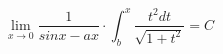 \documentclass[a4paper,UTF8]{article}
\begin{document}
$$ \lim_{x \to 0} \frac{1}{sinx-ax} \cdot \int_{b}^{x} \frac{t^{2}dt}{\sqrt{1+t^{2}}} = C $$
\end{document}
